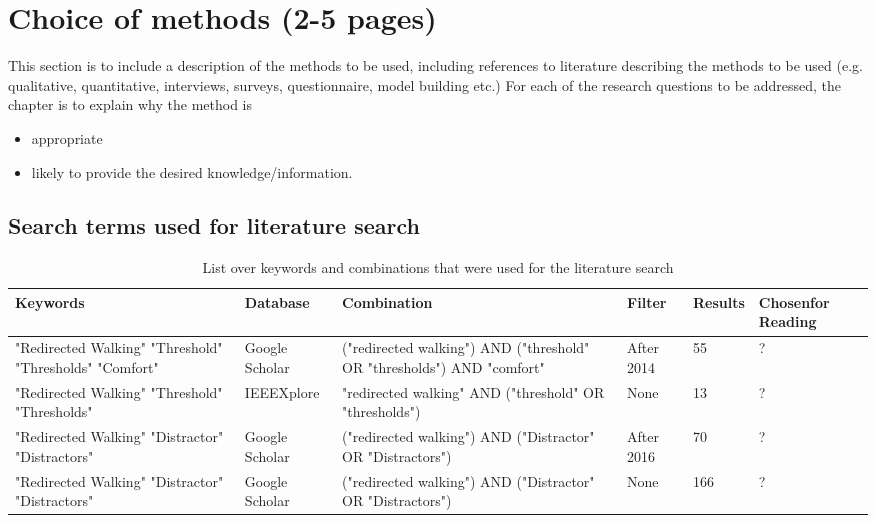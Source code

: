 \chapter{Choice of methods (2-5 pages)}\label{chap:methods}
This section is to include a description of the methods to be used,
including references to literature describing the methods to be used
(e.g. qualitative, quantitative, interviews, surveys,
questionnaire,  model building etc.)
For each of the research questions to be addressed,
the chapter is to explain why the method is
\begin{itemize}
\item appropriate
\item likely to provide the desired knowledge/information.
\end{itemize}

\section{Search terms used for literature search}
\begin{table}[h!]
\centering
\begin{tabularx}{\textwidth}{|X|m{1.7cm}|X|m{1.5cm}|m{1.20cm}|X|} 
\hline
Keywords & Database & Combination & Filter & Results & Chosen\newline for Reading\\ 
\hline
"Redirected Walking"\newline
"Threshold"\newline
"Thresholds"\newline
"Comfort"& Google Scholar & ("redirected walking") AND ("threshold" OR "thresholds") AND "comfort" & After 2014 & 55 & ?\\ 
\hline
"Redirected Walking"\newline
"Threshold"\newline
"Thresholds" & IEEEXplore & "redirected walking" AND ("threshold" OR "thresholds") & None & 13 & ?\\ 
\hline
"Redirected Walking"\newline
"Distractor"\newline
"Distractors" & Google Scholar & ("redirected walking") AND ("Distractor" OR "Distractors") & After 2016 & 70 & ?\\
\hline
"Redirected Walking"\newline
"Distractor"\newline
"Distractors" & Google Scholar & ("redirected walking") AND ("Distractor" OR "Distractors") & None & 166 & ?\\
\hline
\end{tabularx}
\caption{List over keywords and combinations that were used for the literature search}
\label{table:literaturekeywords}
\end{table}
    
